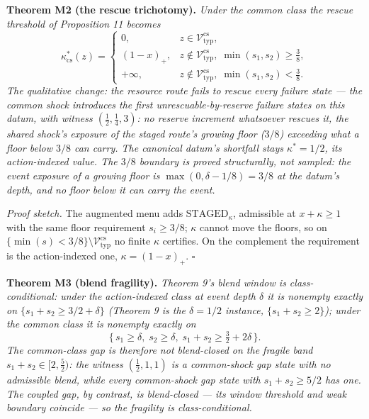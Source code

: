 \documentclass[3p,11pt]{elsarticle}
\begin{document}
\textbf{Theorem M2 (the rescue trichotomy).} \emph{Under the common
class the rescue threshold of Proposition 11 becomes}
\[
\kappa^*_{\mathrm{cs}}(z) =
\begin{cases}
0, & z \in \mathcal{V}_{\mathrm{typ}}^{\mathrm{cs}}, \\[2pt]
(1 - x)_+, & z \notin \mathcal{V}_{\mathrm{typ}}^{\mathrm{cs}},\;
\min(s_1, s_2) \ge \tfrac38, \\[2pt]
+\infty, & z \notin \mathcal{V}_{\mathrm{typ}}^{\mathrm{cs}},\;
\min(s_1, s_2) < \tfrac38.
\end{cases}
\]
\emph{The qualitative change: the resource route fails to rescue every
failure state --- the common shock introduces the first
unrescuable-by-reserve failure states on this datum, with witness
\((\tfrac12, \tfrac14, 3)\): no reserve increment whatsoever rescues
it, the shared shock's exposure of the staged route's growing floor
(\(3/8\)) exceeding what a floor below \(3/8\) can carry. The
canonical datum's shortfall stays \(\kappa^* = 1/2\), its
action-indexed value. The \(3/8\) boundary is proved structurally, not
sampled: the event exposure of a growing floor is \(\max(0, \delta -
1/8) = 3/8\) at the datum's depth, and no floor below it can carry the
event.}

\emph{Proof sketch.} The augmented menu adds
\(\mathrm{STAGED}_\kappa\), admissible at \(x + \kappa \ge 1\)
with the same floor requirement \(s_i \ge 3/8\); \(\kappa\) cannot
move the floors, so on \(\{\min(s) < 3/8\} \setminus
\mathcal{V}_{\mathrm{typ}}^{\mathrm{cs}}\) no finite \(\kappa\)
certifies. On the complement the requirement is the action-indexed one,
\(\kappa = (1 - x)_+\). \ensuremath{\square}

\textbf{Theorem M3 (blend fragility).} \emph{Theorem 9's blend window is
class-conditional: under the action-indexed class at event depth
\(\delta\) it is nonempty exactly on \(\{ s_1 + s_2 \ge 3/2 +
\delta \}\) (Theorem 9 is the \(\delta = 1/2\) instance, \(\{
s_1 + s_2 \ge 2 \}\)); under the common class it is nonempty exactly
on}
\[
\{\, s_1 \ge \delta,\; s_2 \ge \delta,\; s_1 + s_2 \ge \tfrac32 +
2\delta \,\}.
\]
\emph{The common-class gap is therefore not blend-closed on the fragile
band \(s_1 + s_2 \in [2, \tfrac52)\): the witness \((\tfrac12, 1,
1)\) is a common-shock gap state with no admissible blend, while every
common-shock gap state with \(s_1 + s_2 \ge 5/2\) has one. The
coupled gap, by contrast, is blend-closed --- its window threshold and
weak boundary coincide --- so the fragility is class-conditional.}
\end{document}

